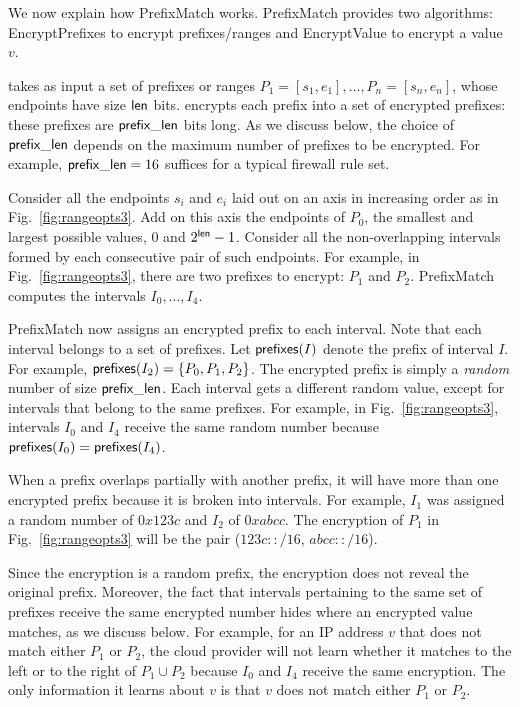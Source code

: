 We now explain how PrefixMatch works.  PrefixMatch provides two algorithms: EncryptPrefixes to encrypt prefixes/ranges and EncryptValue to encrypt a value $v$.



 \pmatch{} takes as input a set of prefixes or ranges $P_1 = [s_1, e_1], \dots, P_n=[s_n, e_n]$, 
whose endpoints have size $\mathsf{len}$ bits. \pmatch{} encrypts each prefix  into a set of encrypted prefixes: these prefixes are $\mathsf{prefix\_len}$ bits long. As we discuss below, the choice of $\mathsf{prefix\_len}$ depends on the maximum number of prefixes to be encrypted. For example,  $\mathsf{prefix\_len} = 16$ suffices for a typical firewall rule set.

Consider all the endpoints $s_i$ and $e_i$ laid out on an axis in increasing order as in Fig.~\ref{fig:rangeopts3}.
Add on this axis the endpoints of $P_0$, the smallest and largest possible values, $0$ and $2^{\mathsf{len}}-1$.
Consider all the non-overlapping intervals formed by each consecutive pair of such endpoints. 
For example, in Fig.~\ref{fig:rangeopts3},  there are two prefixes to encrypt: $P_1$ and $P_2$. PrefixMatch computes the intervals $I_0, \dots, I_4$.

PrefixMatch now assigns an encrypted prefix to each interval. Note that each interval belongs to a set of prefixes. Let $\mathsf{prefixes}(I)$ denote the prefix of interval $I$. For example, $\mathsf{prefixes}(I_2) = \{P_0, P_1, P_2\}$. The encrypted prefix is simply a {\em random} number of size $\mathsf{prefix\_len}$. Each interval gets a different random value, except for intervals that belong to the same prefixes. For example, in Fig.~\ref{fig:rangeopts3}, intervals $I_0$ and $I_4$ receive the same random number because $\mathsf{prefixes}(I_0) = \mathsf{prefixes}(I_4)$.

When a prefix overlaps partially with another prefix, it will have more than one encrypted prefix because it is broken into intervals. For example, $I_1$ was assigned a random number of $0x123c$ and $I_2$ of $0xabcc$. The encryption of  $P_1$ in Fig.~\ref{fig:rangeopts3} will be the pair ($123c::/16$, $abcc::/16$).

Since the encryption is a random prefix, the encryption does not reveal the original prefix. Moreover, the fact that intervals pertaining to the same set of prefixes receive the same encrypted number hides where an encrypted value matches, as we discuss below. For example, for an IP address $v$ that does not match either $P_1$ or $P_2$, the cloud provider will not learn whether it matches to the left or to the right of $P_1 \cup P_2$ because $I_0$ and $I_4$ receive the same encryption. The only information it learns about $v$ is that $v$ does not match either $P_1$ or $P_2$. 

